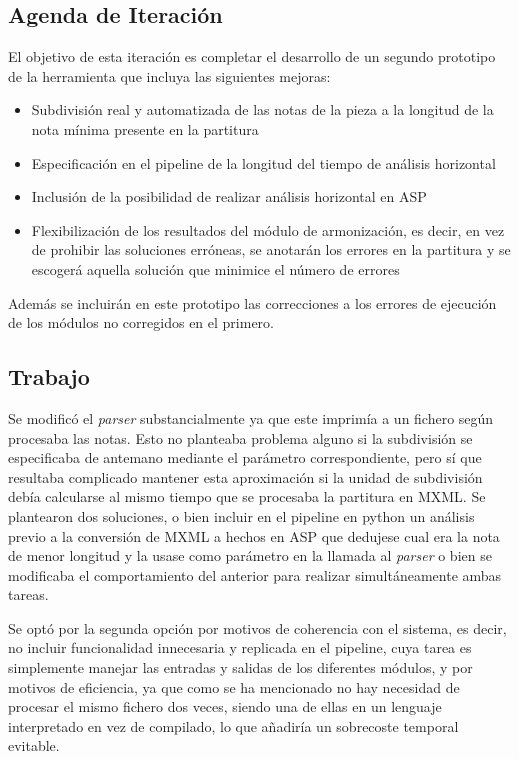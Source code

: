 \subsection{Agenda de Iteración}
\label{subsec:third_iteration_backlog}
El objetivo de esta iteración es completar el desarrollo de un segundo prototipo de la herramienta que incluya las siguientes mejoras:
\begin{itemize}
	\item Subdivisión real y automatizada de las notas de la pieza a la longitud de la nota mínima presente en la partitura
	\item Especificación en el pipeline de la longitud del tiempo de análisis horizontal
	\item Inclusión de la posibilidad de realizar análisis horizontal en ASP
	\item Flexibilización de los resultados del módulo de armonización, es decir, en vez de prohibir las soluciones erróneas, se anotarán los errores en la partitura y se escogerá aquella solución que minimice el número de errores
\end{itemize}
Además se incluirán en este prototipo las correcciones a los errores de ejecución de los módulos no corregidos en el primero.

\subsection{Trabajo}
\label{subsec:third_iteration_work}
Se modificó el \textit{parser} substancialmente ya que este imprimía a un fichero según procesaba las notas. Esto no planteaba problema alguno si la subdivisión se especificaba de antemano mediante el parámetro correspondiente, pero sí que resultaba complicado mantener esta aproximación si la unidad de subdivisión debía calcularse al mismo tiempo que se procesaba la partitura en MXML. Se plantearon dos soluciones, o bien incluir en el pipeline en python un análisis previo a la conversión de MXML a hechos en ASP que dedujese cual era la nota de menor longitud y la usase como parámetro en la llamada al \textit{parser} o bien se modificaba el comportamiento del anterior para realizar simultáneamente ambas tareas. 

Se optó por la segunda opción por motivos de coherencia con el sistema, es decir, no incluir funcionalidad innecesaria y replicada en el pipeline, cuya tarea es simplemente manejar las entradas y salidas de los diferentes módulos, y por motivos de eficiencia, ya que como se ha mencionado no hay necesidad de procesar el mismo fichero dos veces, siendo una de ellas en un lenguaje interpretado en vez de compilado, lo que añadiría un sobrecoste temporal evitable.

